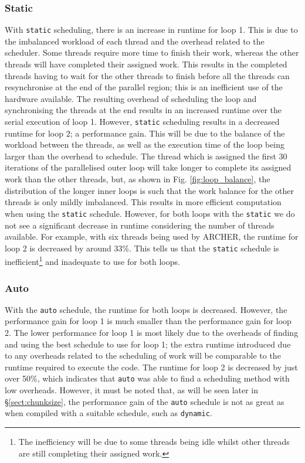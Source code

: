 \documentclass[11pt, a4paper]{article}
\begin{document}
			\subsubsection{Static} \label{sect:static_np}
				With \texttt{static} scheduling, there is an increase in runtime for loop 1. This is due to the imbalanced workload of each thread and the overhead related to the scheduler. Some threads require more time to finish their work, whereas the other threads will have completed their assigned work. This results in the completed threads having to wait for the other threads to finish before all the threads can resynchronise at the end of the parallel region; this is an inefficient use of the hardware available. The resulting overhead of scheduling the loop and synchronising the threads at the end results in an increased runtime over the serial execution of loop 1. However, \texttt{static} scheduling results in a decreased runtime for loop 2; a performance gain. This will be due to the balance of the workload between the threads, as well as the execution time of the loop being larger than the overhead to schedule. The thread which is assigned the first 30 iterations of the parallelised outer loop will take longer to complete its assigned work than the other threads, but, as shown in Fig. \ref{fig:loop_balance}, the distribution of the longer inner loops is such that the work balance for the other threads is only mildly imbalanced. This results in more efficient computation when using the \texttt{static} schedule. However, for both loops with the \texttt{static} we do not see a significant decrease in runtime considering the number of threads available. For example, with six threads being used by ARCHER, the runtime for loop 2 is decreased by around 33\%. This tells us that the \texttt{static} schedule is inefficient\footnote{The inefficiency will be due to some threads being idle whilst other threads are still completing their assigned work.} and inadequate to use for both loops.
				
			\subsubsection{Auto}
				With the \texttt{auto} schedule, the runtime for both loops is decreased. However, the performance gain for loop 1 is much smaller than the performance gain for loop 2. The lower performance for loop 1 is most likely due to the overheads of finding and using the best schedule to use for loop 1; the extra runtime introduced due to any overheads related to the scheduling of work will be comparable to the runtime required to execute the code. The runtime for loop 2 is decreased by just over 50\%, which indicates that \texttt{auto} was able to find a scheduling method with low overheads. However, it must be noted that, as will be seen later in \S\ref{sect:chunksize}, the performance gain of the \texttt{auto} schedule is not as great as when compiled with a suitable schedule, such as \texttt{dynamic}.
		
\end{document}
